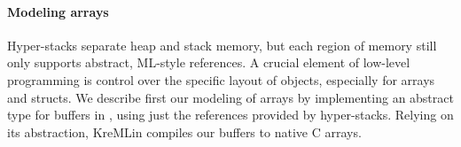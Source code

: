 



\paragraph{Modeling arrays} Hyper-stacks separate heap and
stack memory, but each region of memory still only supports abstract,
ML-style references. A crucial element of low-level programming is
control over the specific layout of objects, especially for arrays and structs.
We describe first our modeling of arrays by implementing an abstract
type for buffers in \lowstar, using just the references provided by
hyper-stacks. Relying on its abstraction, KreMLin compiles our buffers to
native C arrays.

